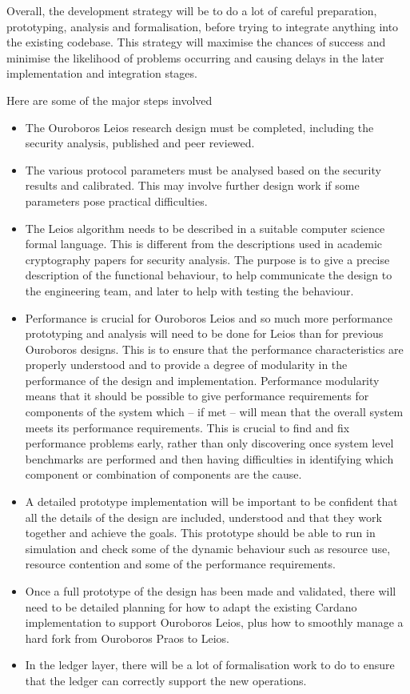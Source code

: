 \documentclass[11pt,a4paper]{article}
\begin{document}
Overall, the development strategy will be to do a lot of careful preparation,
prototyping, analysis and formalisation, before trying to integrate anything
into the existing codebase. This strategy will maximise the chances of success
and minimise the likelihood of problems occurring and causing delays in the
later implementation and integration stages.

Here are some of the major steps involved
\begin{itemize}
\item The Ouroboros Leios research design must be completed, including the
      security analysis, published and peer reviewed.
\item The various protocol parameters must be analysed based on the security
      results and calibrated. This may involve further design work if some
      parameters pose practical difficulties.
\item The Leios algorithm needs to be described in a suitable computer science
      formal language. This is different from the descriptions used in academic
      cryptography papers for security analysis. The purpose is to give a
      precise description of the functional behaviour, to help communicate the
      design to the engineering team, and later to help with testing the
      behaviour.
\item Performance is crucial for Ouroboros Leios and so much more performance
      prototyping and analysis will need to be done for Leios than for previous
      Ouroboros designs. This is to ensure that the performance characteristics
      are properly understood and to provide a degree of modularity in the
      performance of the design and implementation. Performance modularity
      means that it should be possible to give performance requirements for
      components of the system which -- if met -- will mean that the overall
      system meets its performance requirements. This is crucial to find and
      fix performance problems early, rather than only discovering once system
      level benchmarks are performed and then having difficulties in
      identifying which component or combination of components are the cause.
\item A detailed prototype implementation will be important to be confident
      that all the details of the design are included, understood and that they
      work together and achieve the goals. This prototype should be able to
      run in simulation and check some of the dynamic behaviour such as
      resource use, resource contention and some of the performance
      requirements.
\item Once a full prototype of the design has been made and validated, there
      will need to be detailed planning for how to adapt the existing Cardano
      implementation to support Ouroboros Leios, plus how to smoothly manage a
      hard fork from Ouroboros Praos to Leios.
\item In the ledger layer, there will be a lot of formalisation work to do to
      ensure that the ledger can correctly support the new operations.
\end{itemize}
\end{document}
